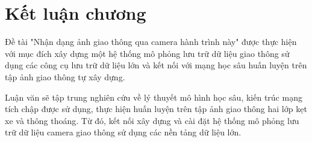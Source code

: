 \section{Kết luận chương}
Đề tài "Nhận dạng ảnh giao thông qua camera hành trình này" được thực hiện với mục đích xây dựng một hệ thống mô phỏng lưu trữ dữ liệu giao thông sử dụng các công cụ lưu trữ dữ liệu lớn và kết nối với mạng học sâu huấn luyện trên tập ảnh giao thông tự xây dựng.\par 
Luận văn sẽ tập trung nghiên cứu về lý thuyết mô hình học sâu, kiến trúc mạng tích chập được sử dụng, thực hiện huấn luyện trên tập ảnh giao thông hai lớp kẹt xe và thông thoáng. Từ đó, kết nối xây dựng và cài đặt hệ thống mô phỏng lưu trữ dữ liệu camera giao thông sử dụng các nền tảng dữ liệu lớn.


